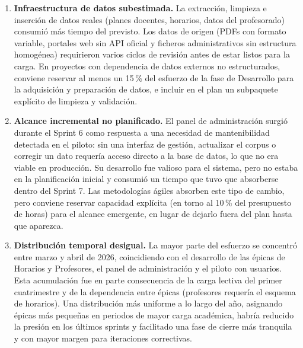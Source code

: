 \begin{enumerate}
    \item \textbf{Infraestructura de datos subestimada.} La extracción, limpieza e inserción de datos reales (planes docentes, horarios, datos del profesorado) consumió más tiempo del previsto. Los datos de origen (PDFs con formato variable, portales web sin API oficial y ficheros administrativos sin estructura homogénea) requirieron varios ciclos de revisión antes de estar listos para la carga. En proyectos con dependencia de datos externos no estructurados, conviene reservar al menos un 15\,\% del esfuerzo de la fase de Desarrollo para la adquisición y preparación de datos, e incluir en el plan un subpaquete explícito de limpieza y validación.

    \item \textbf{Alcance incremental no planificado.} El panel de administración surgió durante el Sprint 6 como respuesta a una necesidad de mantenibilidad detectada en el piloto: sin una interfaz de gestión, actualizar el corpus o corregir un dato requería acceso directo a la base de datos, lo que no era viable en producción. Su desarrollo fue valioso para el sistema, pero no estaba en la planificación inicial y consumió un tiempo que tuvo que absorberse dentro del Sprint 7. Las metodologías ágiles absorben este tipo de cambio, pero conviene reservar capacidad explícita (en torno al 10\,\% del presupuesto de horas) para el alcance emergente, en lugar de dejarlo fuera del plan hasta que aparezca.

    \item \textbf{Distribución temporal desigual.} La mayor parte del esfuerzo se concentró entre marzo y abril de 2026, coincidiendo con el desarrollo de las épicas de Horarios y Profesores, el panel de administración y el piloto con usuarios. Esta acumulación fue en parte consecuencia de la carga lectiva del primer cuatrimestre y de la dependencia entre épicas (profesores requería el esquema de horarios). Una distribución más uniforme a lo largo del año, asignando épicas más pequeñas en periodos de mayor carga académica, habría reducido la presión en los últimos sprints y facilitado una fase de cierre más tranquila y con mayor margen para iteraciones correctivas.
\end{enumerate}
